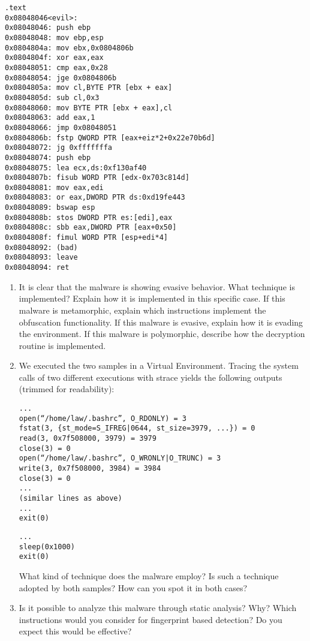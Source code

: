 \begin{verbatim}
.text
0x08048046<evil>:
0x08048046: push ebp
0x08048048: mov ebp,esp
0x0804804a: mov ebx,0x0804806b
0x0804804f: xor eax,eax
0x08048051: cmp eax,0x28
0x08048054: jge 0x0804806b
0x0804805a: mov cl,BYTE PTR [ebx + eax]
0x0804805d: sub cl,0x3
0x08048060: mov BYTE PTR [ebx + eax],cl
0x08048063: add eax,1
0x08048066: jmp 0x08048051
0x0804806b: fstp QWORD PTR [eax+eiz*2+0x22e70b6d]
0x08048072: jg 0xfffffffa
0x08048074: push ebp
0x08048075: lea ecx,ds:0xf130af40
0x0804807b: fisub WORD PTR [edx-0x703c814d]
0x08048081: mov eax,edi
0x08048083: or eax,DWORD PTR ds:0xd19fe443
0x08048089: bswap esp
0x0804808b: stos DWORD PTR es:[edi],eax
0x0804808c: sbb eax,DWORD PTR [eax+0x50]
0x0804808f: fimul WORD PTR [esp+edi*4]
0x08048092: (bad)
0x08048093: leave
0x08048094: ret 
\end{verbatim}
\begin{enumerate}
    \item It is clear that the malware is showing evasive behavior.
        What technique is implemented? Explain how it is implemented in this specific case. 
        If this malware is metamorphic, explain which instructions implement the obfuscation functionality.
        If this malware is evasive, explain how it is evading the environment. 
        If this malware is polymorphic, describe how the decryption routine is implemented. 
    \item We executed the two samples in a Virtual Environment. 
        Tracing the system calls of two different executions with strace yields the following outputs (trimmed for readability):
        \begin{verbatim}
...
open(“/home/law/.bashrc”, O_RDONLY) = 3
fstat(3, {st_mode=S_IFREG|0644, st_size=3979, ...}) = 0
read(3, 0x7f508000, 3979) = 3979
close(3) = 0
open(“/home/law/.bashrc”, O_WRONLY|O_TRUNC) = 3
write(3, 0x7f508000, 3984) = 3984
close(3) = 0
...
(similar lines as above)
...
exit(0)
        \end{verbatim}
        \begin{verbatim}
...
sleep(0x1000)
exit(0)
        \end{verbatim}
        What kind of technique does the malware employ? Is such a technique adopted by both samples? How can you spot it in both cases?
    \item Is it possible to analyze this malware through static analysis? 
        Why? 
        Which instructions would you consider for fingerprint based detection? 
        Do you expect this would be effective?
 \end{enumerate}

